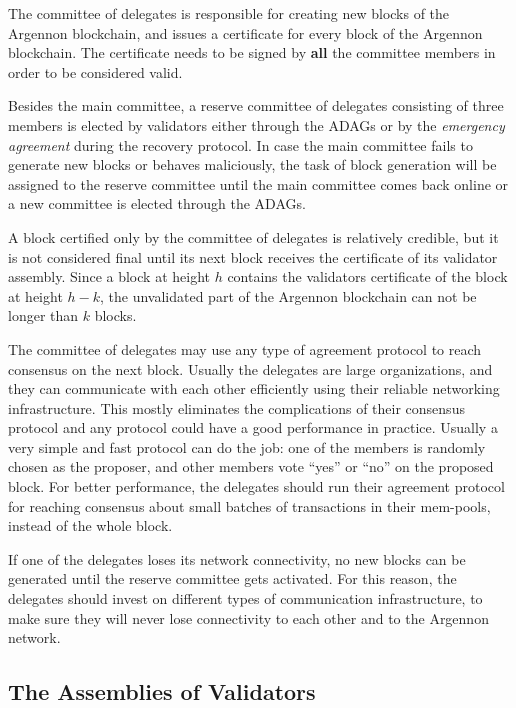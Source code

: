 The committee of delegates is responsible for creating new blocks of the Argennon blockchain, and issues a
certificate for every block of the Argennon blockchain. The certificate needs to be signed
by \textbf{all} the committee members in order to be considered valid.

Besides the main committee, a reserve committee of delegates consisting of three members is elected by validators
either through the ADAGs or by the \emph{emergency agreement} during the recovery protocol. In case the main committee
fails to generate new blocks or behaves maliciously, the task of
block generation will be assigned to the reserve committee until the main committee comes back online or a new
committee is elected through the ADAGs.

A block certified only by the committee of delegates is relatively credible, but it is not considered final
until its next block receives the certificate of its validator assembly. Since a block at height $h$ contains the
validators certificate of the block at height $h-k$, the unvalidated part of the Argennon blockchain can not be longer
than $k$ blocks.

The committee of delegates may use any type of agreement protocol to reach consensus on the
next block. Usually the delegates are large organizations, and they can communicate with each
other efficiently using their reliable networking infrastructure. This mostly eliminates the complications of their
consensus protocol and any protocol could have a good performance in practice. Usually a very simple and fast protocol
can do the job: one of the members is randomly chosen as the proposer, and other members vote ``yes'' or ``no'' on the
proposed block. For better performance, the delegates should run their agreement protocol for reaching consensus about
small batches of transactions in their mem-pools, instead of the whole block.

If one of the delegates loses its network connectivity, no new blocks can be generated until the reserve committee
gets activated. For this reason, the delegates should invest on different types of communication infrastructure, to
make sure they will never lose connectivity to each other and to the Argennon network.

\subsection{The Assemblies of Validators}\label{subsec:validators-committee}

